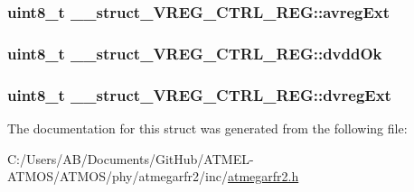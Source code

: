 \hypertarget{struct____struct___v_r_e_g___c_t_r_l___r_e_g_aab7f9fff7bae6cbb1174fdf2a1ac58a6}{
\subsubsection[{avreg\-Ext}]{\setlength{\rightskip}{0pt plus 5cm}uint8\-\_\-t \-\_\-\-\_\-struct\-\_\-\-V\-R\-E\-G\-\_\-\-C\-T\-R\-L\-\_\-\-R\-E\-G\-::avreg\-Ext}}\label{struct____struct___v_r_e_g___c_t_r_l___r_e_g_aab7f9fff7bae6cbb1174fdf2a1ac58a6}
\hypertarget{struct____struct___v_r_e_g___c_t_r_l___r_e_g_ab7f6d0f0c4b774b0583f77ada8c6c8bc}{
\subsubsection[{dvdd\-Ok}]{\setlength{\rightskip}{0pt plus 5cm}uint8\-\_\-t \-\_\-\-\_\-struct\-\_\-\-V\-R\-E\-G\-\_\-\-C\-T\-R\-L\-\_\-\-R\-E\-G\-::dvdd\-Ok}}\label{struct____struct___v_r_e_g___c_t_r_l___r_e_g_ab7f6d0f0c4b774b0583f77ada8c6c8bc}
\hypertarget{struct____struct___v_r_e_g___c_t_r_l___r_e_g_a79d216f2b2cc15d4a1faef159df0c0c2}{
\subsubsection[{dvreg\-Ext}]{\setlength{\rightskip}{0pt plus 5cm}uint8\-\_\-t \-\_\-\-\_\-struct\-\_\-\-V\-R\-E\-G\-\_\-\-C\-T\-R\-L\-\_\-\-R\-E\-G\-::dvreg\-Ext}}\label{struct____struct___v_r_e_g___c_t_r_l___r_e_g_a79d216f2b2cc15d4a1faef159df0c0c2}


The documentation for this struct was generated from the following file\-:\begin{DoxyCompactItemize}
\item 
C\-:/\-Users/\-A\-B/\-Documents/\-Git\-Hub/\-A\-T\-M\-E\-L-\/\-A\-T\-M\-O\-S/\-A\-T\-M\-O\-S/phy/atmegarfr2/inc/\hyperlink{atmegarfr2_8h}{atmegarfr2.\-h}\end{DoxyCompactItemize}
